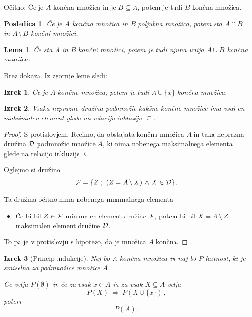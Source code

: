 \documentclass[11pt,paper=b5,DIV=13,headinclude,footinclude]{scrbook}
\def\inn {{~\wedge~}}
\def\sledi {{~\Rightarrow~}}
\def\brez {{\,\setminus\,}}
\newtheorem*{izrek}{Izrek}
\newtheorem*{lema}{Lema}
\newtheorem*{posledica}{Posledica}
\begin{document}
Očitno:
Če je $A$ končna množica in je $B\subseteq A$, potem je tudi $B$ končna
množica.

\begin{posledica}
Če je $A$ končna množica in $B$ poljubna množica, potem sta
$A\cap B$ in $A\brez B$ končni množici.
\end{posledica}

\begin{lema}
Če sta $A$ in $B$ končni množici, potem je tudi njuna unija $A\cup B$ končna množica.
\end{lema}

Brez dokaza. Iz zgornje leme sledi:

\begin{izrek}
Če je $A$ končna množica, potem je tudi $A\cup \{x\}$ končna množica.
\end{izrek}

\begin{izrek}
Vsaka neprazna družina podmnožic kakšne končne množice ima vsaj en maksimalen element glede na relacijo inkluzije $\subseteq$.
\end{izrek}

\begin{proof}
S protislovjem. Recimo, da obstajata končna množica $A$ in taka neprazna
družina ${\cal D}$ podmnožic množice $A$, ki nima nobenega maksimalnega elementa glede na relacijo inkluzije $\subseteq$.

Oglejmo si družino $${\cal F} = \{Z~;~(Z = A\brez X)\inn X\in {\cal D}\}\,.$$

Ta družina očitno nima nobenega minimalnega elementa:
\begin{itemize}
\item Če bi bil $Z\in {\cal F}$ minimalen element družine  ${\cal F}$, potem bi bil
$X = A\brez Z$ maksimalen element družine  ${\cal D}$.
\end{itemize}
To pa je v protislovju s hipotezo, da je množica $A$ končna.
\end{proof}


\begin{izrek}[Princip indukcije]\label{izrek:indukcija}
Naj bo $A$ končna množica in naj bo $P$ lastnost, ki je smiselna za podmnožice množice $A$.

Če velja $P(\emptyset)$ in če za vsak $x\in A$ in za vsak $X\subseteq A$ velja
$$P(X)\sledi P(X\cup \{x\})\,,$$
potem
$$P(A)\,.$$
\end{izrek}
\end{document}
